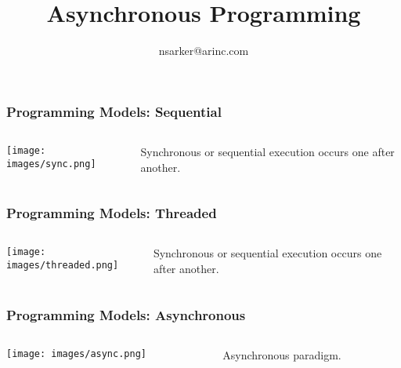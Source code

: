 \documentclass{beamer}
\author{nsarker@arinc.com}
\title{Asynchronous Programming}
\date{}
\begin{document}
\small

\begin{frame}
    \titlepage
\end{frame}


\begin{frame}
\frametitle{Programming Models: Sequential}
\begin{columns}[T]
    \begin{column}{0.1\textwidth}
        \texttt{[image: images/sync.png]}
    \end{column}
    \begin{column}{.5\textwidth}
        Synchronous or sequential execution occurs one after another.
    \end{column}
\end{columns}
\end{frame}


\begin{frame}
\frametitle{Programming Models: Threaded}
\begin{columns}[T]
    \begin{column}{.5\textwidth}
        \texttt{[image: images/threaded.png]}
    \end{column}
    \begin{column}{.5\textwidth}
        Synchronous or sequential execution occurs one after another.
    \end{column}
\end{columns}

\end{frame}


\begin{frame}
\frametitle{Programming Models: Asynchronous}
\begin{columns}[T]
    \begin{column}{.5\textwidth}
        \texttt{[image: images/async.png]}
    \end{column}
    \begin{column}{.5\textwidth}
        Asynchronous paradigm.
    \end{column}
\end{columns}

\end{frame}
\end{document}

